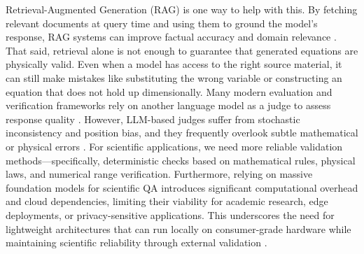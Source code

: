 \documentclass[a4paper,fleqn]{cas-sc}
\begin{document}
Retrieval-Augmented Generation (RAG) is one way to help with this. By fetching relevant documents at query time and using them to ground the model's response, RAG systems can improve factual accuracy and domain relevance \citep{RAG-Lewis, Gao-RAG-Survey}. That said, retrieval alone is not enough to guarantee that generated equations are physically valid. Even when a model has access to the right source material, it can still make mistakes like substituting the wrong variable or constructing an equation that does not hold up dimensionally. Many modern evaluation and verification frameworks rely on another language model as a judge to assess response quality \citep{zheng2023judging}. However, LLM-based judges suffer from stochastic inconsistency and position bias, and they frequently overlook subtle mathematical or physical errors \citep{zheng2023judging, SciBench}. For scientific applications, we need more reliable validation methods—specifically, deterministic checks based on mathematical rules, physical laws, and numerical range verification. Furthermore, relying on massive foundation models for scientific QA introduces significant computational overhead and cloud dependencies, limiting their viability for academic research, edge deployments, or privacy-sensitive applications. This underscores the need for lightweight architectures that can run locally on consumer-grade hardware while maintaining scientific reliability through external validation \citep{Qwen-Report, LoRA-Hu}.
\end{document}
